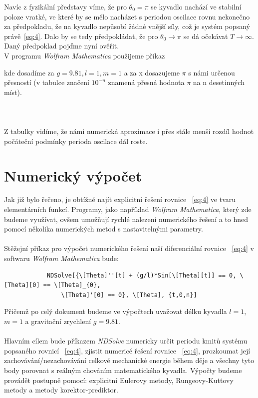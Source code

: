 \documentclass[reqno, a4paper]{amsart}
\begin{document}
	Navíc z fyzikální představy víme, že pro $\theta_{0}=\pi$ se kyvadlo nachází ve stabilní poloze vratké, ve které by se mělo nacházet s periodou oscilace rovnu nekonečno za předpokladu, že na kyvadlo nepůsobí žádné vnější síly, což je systém popsaný právě~\eqref{eq:4}.
	Dalo by se tedy předpokládat, že pro $\theta_{0} \longrightarrow \pi$ se dá očekávat $T\longrightarrow \infty $. Daný předpoklad pojďme nyní ověřit.\\
	V programu \textit{Wolfram Mathematica} použijeme příkaz
	\begin{verbatim*}
		
		NDSolve[{(g*Sin[y[t]])/l+(y^\[Prime]\[Prime])[t]==0, 
			Derivative[1][y][0]==0,y[0]==x,WhenEvent[y[t]==0,{Print[t],
				"StopIntegration"}]},y,{t,0,50}],
		
	\end{verbatim*}
	kde dosadíme za $ g=9.81, l=1, m=1$  a za x dosazujeme $ \pi $ s námi určenou přesností (v tabulce značení $ 10^{-n} $ znamená přesná hodnota $ \pi $ na n desetinných míst).
	\\
	\\
	\\
	\\
	

	
	Z tabulky vidíme, že námi numerická aproximace i přes stále menší rozdíl hodnot počáteční podmínky perioda oscilace dál roste. 
		\section{Numerický výpočet}
		Jak již bylo řečeno, je obtížné najít explicitní řešení rovnice ~\eqref{eq:4} ve tvaru elementárních funkcí. Programy, jako například \textit{Wolfram Mathematica}, který zde budeme využívat, ovšem umožňují rychlé nalezení numerického řešení a to hned pomocí několika numerických metod s nastavitelnými parametry.\
		\\
		\\
		Stěžejní příkaz pro výpočet numerického řešení naší diferenciální rovnice ~\eqref{eq:4} v softwaru \textit{Wolfram Mathematica} bude:
		\begin{verbatim}
			NDSolve[{\[Theta]''[t] + (g/l)*Sin[\[Theta][t]] == 0, \[Theta][0] == \[Theta]_{0}, 
				\[Theta]'[0] == 0}, \[Theta], {t,0,n}]
		\end{verbatim}
		Přičemž po celý dokument budeme ve výpočtech uvažovat délku kyvadla $ l=1 $, $ m=1 $ a gravitační zrychlení $ g=9.81 $.
		\\
		\\
		Hlavním cílem bude příkazem \textit{NDSolve} numericky určit periodu kmitů systému popsaného rovnicí ~\eqref{eq:4}, zjistit numericé řešení rovnice ~\eqref{eq:4}, prozkoumat její zachovávání/nezachovávání celkové mechanické energie během děje a všechny tyto body porovnat s reálným chováním matematického kyvadla. Výpočty budeme provádět postupně pomocí: explicitní Eulerovy metody, Rungeovy-Kuttovy metody a metody korektor-prediktor.
\end{document}

